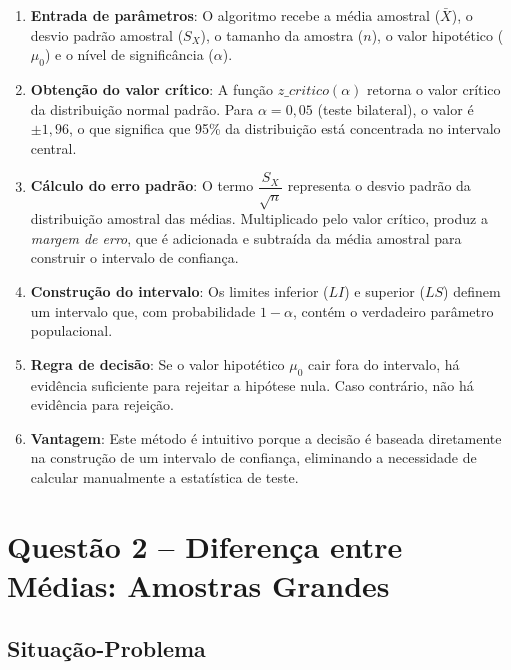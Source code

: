 \documentclass[12pt,a4paper]{article}
\begin{document}
\begin{enumerate}
  \item \textbf{Entrada de parâmetros}: O algoritmo recebe a média amostral ($\bar{X}$),
  o desvio padrão amostral ($S_X$), o tamanho da amostra ($n$), o valor hipotético ($\mu_0$)
  e o nível de significância ($\alpha$).

  \item \textbf{Obtenção do valor crítico}: A função $z\_critico(\alpha)$ retorna o valor crítico
  da distribuição normal padrão. Para $\alpha = 0{,}05$ (teste bilateral), o valor é $\pm 1{,}96$,
  o que significa que 95\% da distribuição está concentrada no intervalo central.

  \item \textbf{Cálculo do erro padrão}: O termo $\dfrac{S_X}{\sqrt{n}}$ representa o desvio padrão
  da distribuição amostral das médias. Multiplicado pelo valor crítico, produz a \textit{margem de erro},
  que é adicionada e subtraída da média amostral para construir o intervalo de confiança.

  \item \textbf{Construção do intervalo}: Os limites inferior ($LI$) e superior ($LS$) definem
  um intervalo que, com probabilidade $1-\alpha$, contém o verdadeiro parâmetro populacional.

  \item \textbf{Regra de decisão}: Se o valor hipotético $\mu_0$ cair fora do intervalo, há evidência
  suficiente para rejeitar a hipótese nula. Caso contrário, não há evidência para rejeição.

  \item \textbf{Vantagem}: Este método é intuitivo porque a decisão é baseada diretamente na
  construção de um intervalo de confiança, eliminando a necessidade de calcular manualmente
  a estatística de teste.
\end{enumerate}

\newpage

\section*{Questão 2 -- Diferença entre Médias: Amostras Grandes}

\subsection*{Situação-Problema}
\end{document}
